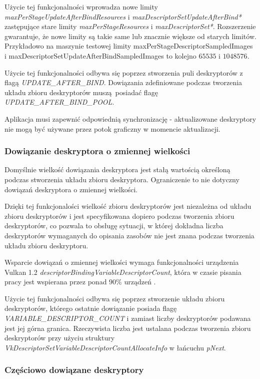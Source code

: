 Użycie tej funkcjonalności wprowadza nowe limity \textit{maxPerStageUpdateAfterBindResources} i \textit{maxDescriptorSetUpdateAfterBind*}
zastępujące stare limity \textit{maxPerStageResources} i \textit{maxDescriptorSet*}. Rozszerzenie gwarantuje, że nowe limity są takie same lub znacznie większe od starych limitów. Przykładowo na maszynie testowej limity maxPerStageDescriptorSampledImages i maxDescriptorSetUpdateAfterBindSampledImages to kolejno $65535$ i $1048576$.

Użycie tej funkcjonalności odbywa się poprzez stworzenia puli deskryptorów z flagą \textit{UPDATE\_AFTER\_BIND}. Dowiązania zdefiniowane podczas tworzenia układu zbioru deskryptorów muszą posiadać flagę
\textit{UPDATE\_AFTER\_BIND\_POOL}.

Aplikacja musi zapewnić odpowiednią synchronizację - aktualizowane deskryptory nie mogą być używane przez potok graficzny w momencie aktualizacji.

\subsubsection {Dowiązanie deskryptora o zmiennej wielkości}

Domyślnie wielkość dowiązania deskryptora jest stałą wartością określoną podczas stworzenia układu zbioru deskryptora.
Ograniczenie to nie dotyczny dowiązań deskryptora o zmiennej wielkości.

Dzięki tej funkcjonalości wielkość zbioru deskryptorów jest niezależna od układu zbioru deskryptorów i jest specyfikowana dopiero podczas tworzenia zbioru deskryptorów, co pozwala to obsługę sytuacji, w której dokładna liczba deskryptorów wymaganych do opisania zasobów nie jest znana podczas tworzenia układu zbioru deskryptoru.

Wsparcie dowiązań o zmiennej wielkości wymaga funkcjonalności urządzenia Vulkan 1.2 \textit{descriptorBindingVariableDescriptorCount}, która w czasie pisania pracy jest wspierana przez ponad $90\%$ urządzeń \cite{GPUINFO}.

Użycie tej funkcjonalności odbywa się poprzez stworzenie układu zbioru deskryptorów, którego ostatnie dowiązanie posiada flagę \textit{VARIABLE\_DESCRIPTOR\_COUNT} i zamiast liczby deskryptorów podawana jest jej górna granica.
Rzeczywista liczba jest ustalana podczas tworzenia zbioru deskryptorów przy użyciu struktury \textit{VkDescriptorSetVariableDescriptorCountAllocateInfo} w łańcuchu \textit{pNext}.

\subsubsection {Częściowo dowiązane deskryptory}

